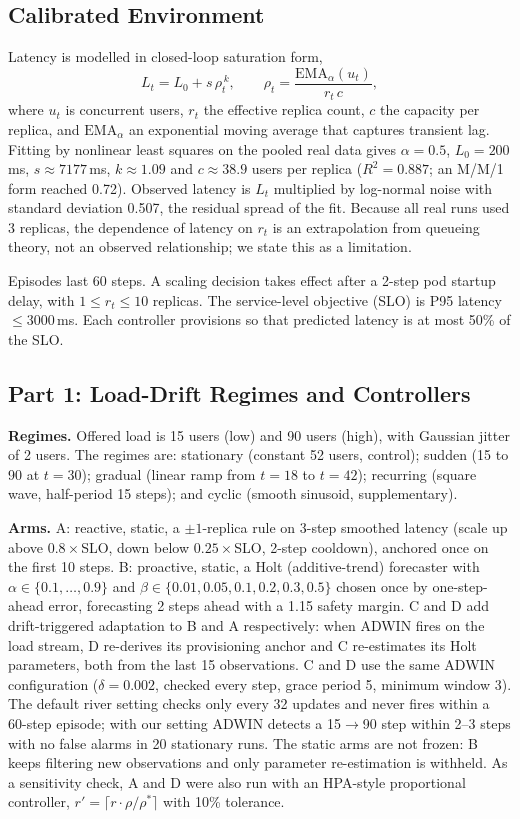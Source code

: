 \subsection{Calibrated Environment}
Latency is modelled in closed-loop saturation form,
\begin{equation}
L_t = L_0 + s\,\rho_t^{\,k}, \qquad \rho_t = \frac{\mathrm{EMA}_{\alpha}(u_t)}{r_t \, c},
\end{equation}
where $u_t$ is concurrent users, $r_t$ the effective replica count, $c$ the capacity per replica, and $\mathrm{EMA}_\alpha$ an exponential moving average that captures transient lag. Fitting by nonlinear least squares on the pooled real data gives $\alpha=0.5$, $L_0=200$\,ms, $s\approx7177$\,ms, $k\approx1.09$ and $c\approx38.9$ users per replica ($R^2=0.887$; an M/M/1 form reached 0.72). Observed latency is $L_t$ multiplied by log-normal noise with standard deviation 0.507, the residual spread of the fit. Because all real runs used 3 replicas, the dependence of latency on $r_t$ is an extrapolation from queueing theory, not an observed relationship; we state this as a limitation.

Episodes last 60 steps. A scaling decision takes effect after a 2-step pod startup delay, with $1\le r_t\le10$ replicas. The service-level objective (SLO) is P95 latency $\le3000$\,ms. Each controller provisions so that predicted latency is at most 50\% of the SLO.

\subsection{Part 1: Load-Drift Regimes and Controllers}
\textbf{Regimes.} Offered load is 15 users (low) and 90 users (high), with Gaussian jitter of 2 users. The regimes are: stationary (constant 52 users, control); sudden (15 to 90 at $t=30$); gradual (linear ramp from $t=18$ to $t=42$); recurring (square wave, half-period 15 steps); and cyclic (smooth sinusoid, supplementary).

\textbf{Arms.} A: reactive, static, a $\pm1$-replica rule on 3-step smoothed latency (scale up above $0.8\times$SLO, down below $0.25\times$SLO, 2-step cooldown), anchored once on the first 10 steps. B: proactive, static, a Holt (additive-trend) forecaster with $\alpha\in\{0.1,\dots,0.9\}$ and $\beta\in\{0.01,0.05,0.1,0.2,0.3,0.5\}$ chosen once by one-step-ahead error, forecasting 2 steps ahead with a 1.15 safety margin. C and D add drift-triggered adaptation to B and A respectively: when ADWIN fires on the load stream, D re-derives its provisioning anchor and C re-estimates its Holt parameters, both from the last 15 observations. C and D use the same ADWIN configuration ($\delta=0.002$, checked every step, grace period 5, minimum window 3). The default river setting checks only every 32 updates and never fires within a 60-step episode; with our setting ADWIN detects a 15$\rightarrow$90 step within 2--3 steps with no false alarms in 20 stationary runs. The static arms are not frozen: B keeps filtering new observations and only parameter re-estimation is withheld. As a sensitivity check, A and D were also run with an HPA-style proportional controller, $r' = \lceil r\cdot\rho/\rho^{*}\rceil$ with 10\% tolerance.

